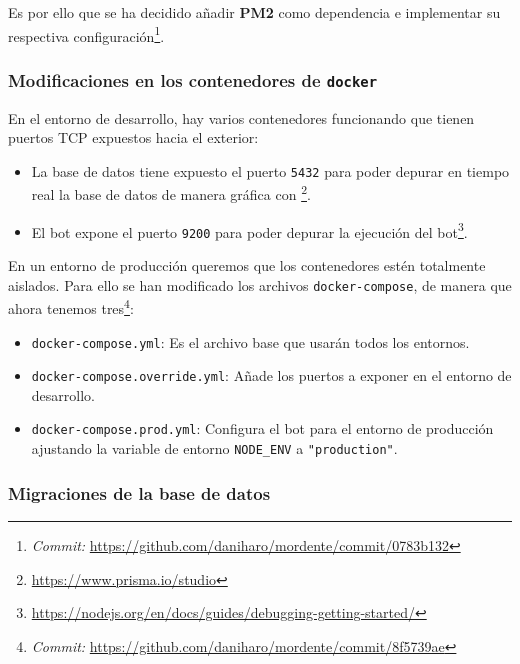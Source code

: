Es por ello que se ha decidido añadir \textbf{PM2} como dependencia e implementar su respectiva configuración\footnote{\textit{Commit:} \url{https://github.com/daniharo/mordente/commit/0783b132}}.

\subsubsection{Modificaciones en los contenedores de \texttt{docker}}

En el entorno de desarrollo, hay varios contenedores funcionando que tienen puertos TCP expuestos hacia el exterior:

\begin{itemize}
    \item La base de datos tiene expuesto el puerto \texttt{5432} para poder depurar en tiempo real la base de datos de manera gráfica con \footnote{\url{https://www.prisma.io/studio}}.
    \item El bot expone el puerto \texttt{9200} para poder depurar la ejecución del bot\footnote{\url{https://nodejs.org/en/docs/guides/debugging-getting-started/}}.
\end{itemize}

En un entorno de producción queremos que los contenedores estén totalmente aislados. Para ello se han modificado los archivos \texttt{docker-compose}, de manera que ahora tenemos tres\footnote{\textit{Commit:} \url{https://github.com/daniharo/mordente/commit/8f5739ae}}:

\begin{itemize}
    \item \texttt{docker-compose.yml}: Es el archivo base que usarán todos los entornos.
    \item \texttt{docker-compose.override.yml}: Añade los puertos a exponer en el entorno de desarrollo.
    \item \texttt{docker-compose.prod.yml}: Configura el bot para el entorno de producción ajustando la variable de entorno \texttt{NODE\_ENV} a \texttt{"production"}.
\end{itemize}


\subsubsection{Migraciones de la base de datos}

